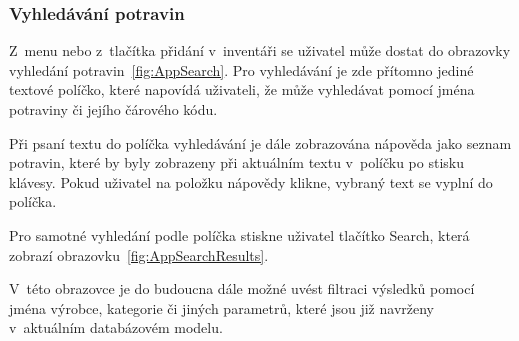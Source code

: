 \documentclass[thesis=B,czech]{FITthesis}[2013/10/20]
\begin{document}
\clearpage

\subsubsection{Vyhledávání potravin}

Z~menu nebo z~tlačítka přidání v~inventáři se uživatel může dostat do obrazovky vyhledání potravin~\ref{fig:AppSearch}. Pro vyhledávání je zde přítomno jediné textové políčko, které napovídá uživateli, že může vyhledávat pomocí jména potraviny či jejího čárového kódu.

Při psaní textu do políčka vyhledávání je dále zobrazována nápověda jako seznam potravin, které by byly zobrazeny při aktuálním textu v~políčku po stisku klávesy. Pokud uživatel na položku nápovědy klikne, vybraný text se vyplní do políčka.

Pro samotné vyhledání podle políčka stiskne uživatel tlačítko Search, která zobrazí obrazovku~\ref{fig:AppSearchResults}.

V~této obrazovce je do budoucna dále možné uvést filtraci výsledků pomocí jména výrobce, kategorie či jiných parametrů, které jsou již navrženy v~aktuálním databázovém modelu.
\end{document}

